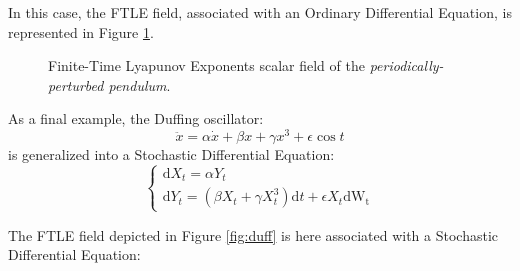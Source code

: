 \documentclass{juliacon}
\newcommand{\drv}{\textrm{d}}
\begin{document}
In this case, the FTLE field, associated with an Ordinary Differential Equation, is represented in Figure \ref{fig:ppp}.

\begin{figure}[h]
    \centering
    \caption{Finite-Time Lyapunov Exponents scalar field of the \emph{periodically-perturbed pendulum}.}
    \label{fig:ppp}
\end{figure}



As a final example, the Duffing oscillator:
\begin{equation}
\ddot{x}=\alpha \dot{x}+\beta x+\gamma x^3 + \epsilon\cos{t}
\end{equation}
is generalized into a Stochastic Differential Equation: 
\begin{equation}
    \begin{cases}
    \drv X_t= \alpha Y_t \\
    \drv Y_t = (\beta X_t + \gamma X_t^3)\drv t +\epsilon X_t \drv \mathrm{W_t} 
\end{cases}
\end{equation}

The FTLE field depicted in Figure \ref{fig:duff} is here associated with a Stochastic Differential Equation:
\end{document}
